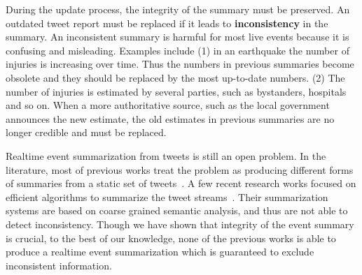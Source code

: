 \documentclass[envcountsame]{llncs}
\begin{document}
During the update process, the integrity of the summary must be preserved.  An outdated tweet report must be replaced if it leads to \textbf{inconsistency} in the summary. An inconsistent summary is harmful for most live events because it is confusing and misleading. Examples include (1) in an earthquake the number of injuries is increasing over time. Thus the numbers in previous summaries become obsolete and they should be replaced by the most up-to-date numbers. (2) The number of injuries is  estimated by several parties, such as  bystanders, hospitals and so on. When a more authoritative source, such as the local government announces the new estimate, the old estimates in previous summaries are no longer credible and must be replaced.

Realtime event summarization from tweets is still an open problem. In the literature, most of previous works treat the problem as producing different forms of summaries from a static set of tweets~\cite{Takamura2011Summarizing,Lin2012Generating,Rudra2015Extracting,Liu2016LEDS,Gillani2017Post}. A few recent research works focused on efficient algorithms to summarize the tweet streams~\cite{Shou2013Sumblr,Zubiaga2012Towards}. Their summarization systems are based on coarse grained semantic analysis, and thus are not able to detect inconsistency. Though we have shown that integrity of the event summary is crucial, to the best of our knowledge, none of the previous works is able to produce a realtime event summarization which is guaranteed to exclude inconsistent information.
\end{document}
